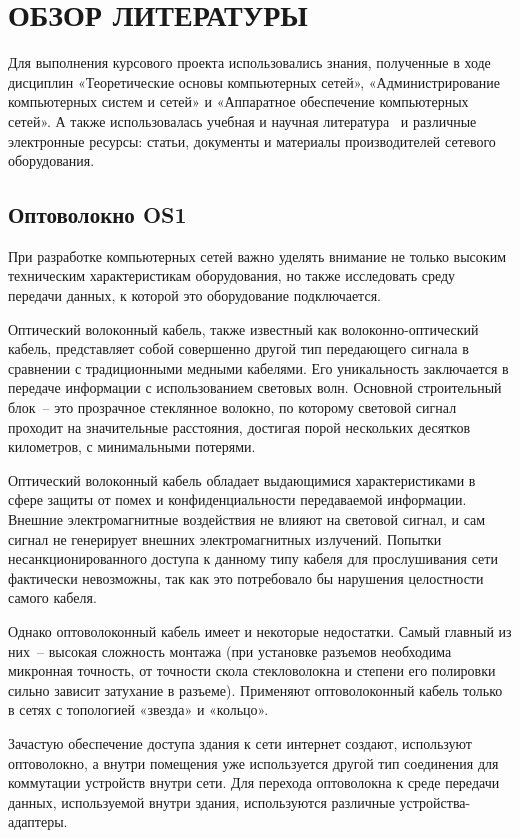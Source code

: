 \section{ОБЗОР ЛИТЕРАТУРЫ}
\label{sec:domain}

Для выполнения курсового проекта использовались знания, полученные в ходе дисциплин «Теоретические основы компьютерных сетей», «Администрирование компьютерных систем и сетей» и «Аппаратное обеспечение компьютерных сетей». А также использовалась учебная и научная литература~\cite{book_komp_science_olifer, book_komp_science_tanen} и различные электронные ресурсы: статьи, документы и материалы производителей сетевого оборудования.

\subsection{Оптоволокно OS1}

При разработке компьютерных сетей важно уделять внимание не только высоким техническим характеристикам оборудования, но также исследовать среду передачи данных, к которой это оборудование подключается.

Оптический волоконный кабель, также известный как волоконно-оптический кабель, представляет собой совершенно другой тип передающего сигнала в сравнении с традиционными медными кабелями. Его уникальность заключается в передаче информации с использованием световых волн. Основной строительный блок~-- это прозрачное стеклянное волокно, по которому световой сигнал проходит на значительные расстояния, достигая порой нескольких десятков километров, с минимальными потерями.

Оптический волоконный кабель обладает выдающимися характеристиками в сфере защиты от помех и конфиденциальности передаваемой информации. Внешние электромагнитные воздействия не влияют на световой сигнал, и сам сигнал не генерирует внешних электромагнитных излучений. Попытки несанкционированного доступа к данному типу кабеля для прослушивания сети фактически невозможны, так как это потребовало бы нарушения целостности самого кабеля.

Однако оптоволоконный кабель имеет и некоторые недостатки. Самый главный из них~-- высокая сложность монтажа (при установке разъемов необходима микронная точность, от точности скола стекловолокна и степени его полировки сильно зависит затухание в разъеме). Применяют оптоволоконный кабель только в сетях с топологией «звезда» и «кольцо».

Зачастую обеспечение доступа здания к сети интернет создают, используют оптоволокно, а внутри помещения уже используется другой тип соединения для коммутации устройств внутри сети. Для перехода оптоволокна к среде передачи данных, используемой внутри здания, используются различные устройства-адаптеры. 

